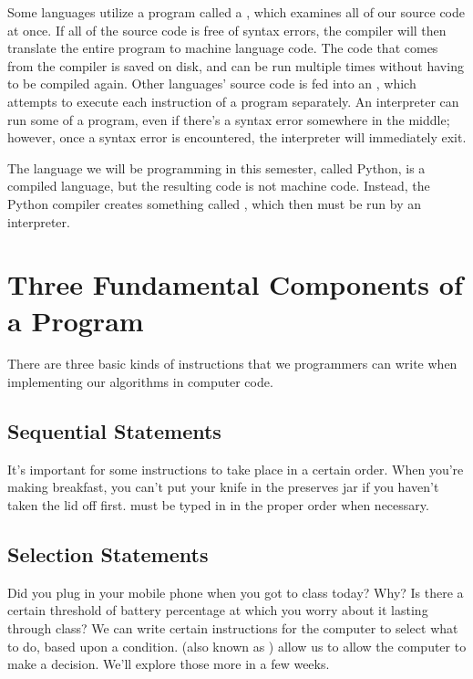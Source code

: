 Some languages utilize a program called a , which examines all of our source code at once.  If all of the source code is free of syntax errors, the compiler will then translate the entire program to machine language code.  The code that comes from the compiler is saved on disk, and can be run multiple times without having to be compiled again.  Other languages' source code is fed into an , which attempts to execute each instruction of a program separately.  An interpreter can run some of a program, even if there's a syntax error somewhere in the middle; however, once a syntax error is encountered, the interpreter will immediately exit.

The language we will be programming in this semester, called Python, is a compiled language, but the resulting code is not machine code.  Instead, the Python compiler creates something called , which then must be run by an interpreter.

\section{Three Fundamental Components of a Program}

There are three basic kinds of instructions that we programmers can write when implementing our algorithms in computer code.

\subsection{Sequential Statements}

It's important for some instructions to take place in a certain order.  When you're making breakfast, you can't put your knife in the preserves jar if you haven't taken the lid off first.   must be typed in in the proper order when necessary.

\subsection{Selection Statements}

Did you plug in your mobile phone when you got to class today?  Why?  Is there a certain threshold of battery percentage at which you worry about it lasting through class?  We can write certain instructions for the computer to select what to do, based upon a condition.   (also known as ) allow us to allow the computer to make a decision.  We'll explore those more in a few weeks.  

